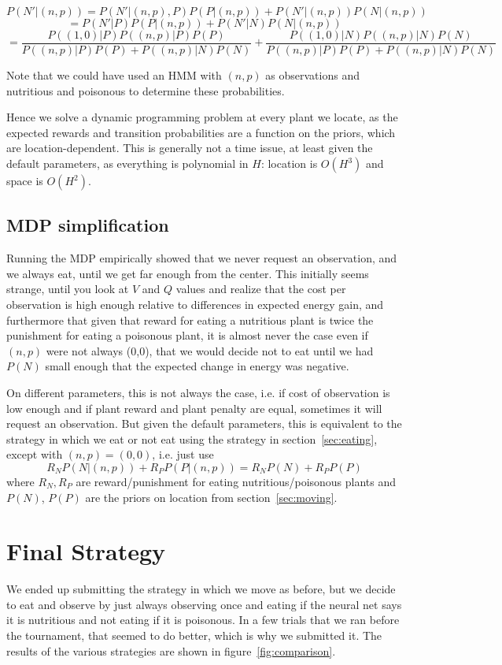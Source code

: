 \documentclass{article}
\begin{document}
\[P(N'|(n,p))=P(N'|(n,p),P)P(P|(n,p))+P(N'|(n,p))P(N|(n,p))\]
\[=P(N'|P)P(P|(n,p))+P(N'|N)P(N|(n,p))\]
\[=\frac{P((1,0)|P)P((n,p)|P)P(P)}{P((n,p)|P)P(P)+P((n,p)|N)P(N)} + \frac{P((1,0)|N)P((n,p)|N)P(N)}{P((n,p)|P)P(P)+P((n,p)|N)P(N)}\]

Note that we could have used an HMM with $(n,p)$ as observations 
and nutritious and poisonous to determine these probabilities. 

Hence we solve a dynamic programming problem at every plant we locate,
as the expected rewards and transition probabilities are a function on
the priors, which are location-dependent. This is generally not a time issue,
at least given the default parameters, 
as everything is polynomial in $H$: location is $O(H^3)$ and space is $O(H^2)$. 


\subsection{MDP simplification}
Running the MDP empirically showed that we never request an
observation, and we always eat, until we get far enough from the
center.  This initially seems strange, until you look at $V$ and $Q$
values and realize that the cost per observation is high enough
relative to differences in expected energy gain, and furthermore that
given that reward for eating a nutritious plant is twice the
punishment for eating a poisonous plant, it is almost never the case
even if $(n,p)$ were not always (0,0), that we would decide not to eat
until we had $P(N)$ small enough that the expected change in energy
was negative.

On different parameters, this is not always the case, i.e. if cost of
observation is low enough and if plant reward and plant penalty are
equal, sometimes it will request an observation. But given the default
parameters, this is equivalent to the strategy in which we eat or not
eat using the strategy in section~\ref{sec:eating}, except with
$(n,p)=(0,0)$, i.e.  just use
\[R_NP(N|(n,p))+R_PP(P|(n,p))=R_NP(N)+R_PP(P)\]
where $R_N,R_P$ are reward/punishment for eating nutritious/poisonous
plants and $P(N)$, $P(P)$ are the priors on location from
section~\ref{sec:moving}.


\section{Final Strategy}
We ended up submitting the strategy in which we move as before, but we
decide to eat and observe by just always observing once and eating if
the neural net says it is nutritious and not eating if it is
poisonous. In a few trials that we ran before the tournament, that
seemed to do better, which is why we submitted it. The results of the
various strategies are shown in figure~\ref{fig:comparison}.
\end{document}
